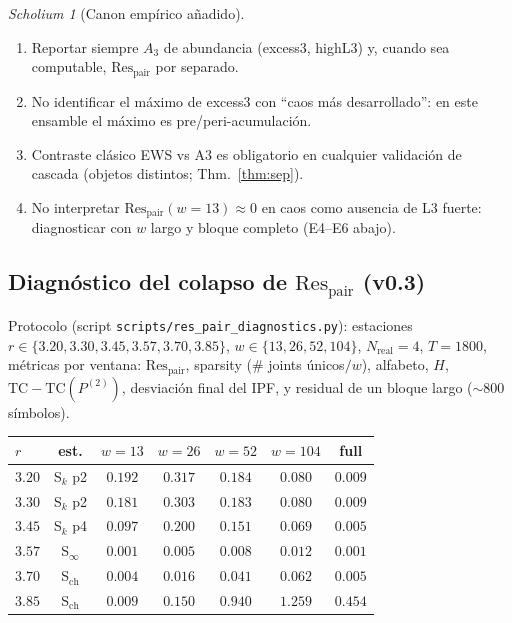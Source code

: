\documentclass[11pt,a4paper]{article}
\theoremstyle{definition}
\theoremstyle{plain}
\theoremstyle{remark}
\newtheorem{scholium}{Scholium}[section]
\newcommand{\Res}{\mathrm{Res}}
\begin{document}
\begin{scholium}[Canon emp\'irico a\~nadido]
\label{sch:emp}
\begin{enumerate}[label=\textbf{E\arabic*.}]
  \item Reportar siempre $A_3$ de abundancia (excess3, highL3) y, cuando
  sea computable, $\Res_{\mathrm{pair}}$ por separado.
  \item No identificar el m\'aximo de excess3 con ``caos m\'as
  desarrollado'': en este ensamble el m\'aximo es pre/peri-acumulaci\'on.
  \item Contraste cl\'asico EWS vs A3 es obligatorio en cualquier
  validaci\'on de cascada (objetos distintos; Thm.~\ref{thm:sep}).
  \item No interpretar $\Res_{\mathrm{pair}}(w{=}13)\approx 0$ en caos
  como ausencia de L3 fuerte: diagnosticar con $w$ largo y bloque
  completo (E4--E6 abajo).
\end{enumerate}
\end{scholium}

\subsection{Diagn\'ostico del colapso de $\Res_{\mathrm{pair}}$ (v0.3)}
\label{sec:resdiag}

Protocolo (script \texttt{scripts/res\_pair\_diagnostics.py}):
estaciones $r\in\{3.20,3.30,3.45,3.57,3.70,3.85\}$,
$w\in\{13,26,52,104\}$, $N_{\mathrm{real}}=4$, $T=1800$,
m\'etricas por ventana: $\Res_{\mathrm{pair}}$, sparsity
($\#$ joints \'unicos$/w$), alfabeto, $H$, $\mathrm{TC}-\mathrm{TC}(P^{(2)})$,
desviaci\'on final del IPF, y residual de un bloque largo
($\sim 800$ s\'imbolos).

\begin{center}
\small
\begin{tabular}{@{}lcccccc@{}}
\toprule
$r$ & est. & $w{=}13$ & $w{=}26$ & $w{=}52$ & $w{=}104$ & full \\
\midrule
$3.20$ & S$_k$ p2 & $0.192$ & $0.317$ & $0.184$ & $0.080$ & $0.009$ \\
$3.30$ & S$_k$ p2 & $0.181$ & $0.303$ & $0.183$ & $0.080$ & $0.009$ \\
$3.45$ & S$_k$ p4 & $0.097$ & $0.200$ & $0.151$ & $0.069$ & $0.005$ \\
$3.57$ & S$_\infty$ & $0.001$ & $0.005$ & $0.008$ & $0.012$ & $0.001$ \\
$3.70$ & S$_{\mathrm{ch}}$ & $0.004$ & $0.016$ & $0.041$ & $0.062$ & $0.005$ \\
$3.85$ & S$_{\mathrm{ch}}$ & $0.009$ & $0.150$ & $0.940$ & $1.259$ & $0.454$ \\
\bottomrule
\end{tabular}
\end{center}
\end{document}
